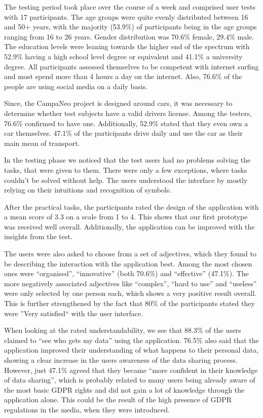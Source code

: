 \documentclass[../paper.tex]{subfiles}
\begin{document}
  The testing period took place over the course of a week and comprised
  user tests with 17 participants. The age groups were quite evenly
  distributed between 16 and 50+ years, with the majority (53.9\%) of
  participants being in the age groups ranging from 16 to 26 years.
  Gender distribution was 70.6\% female, 29.4\% male. The education levels
  were leaning towards the higher end of the spectrum with 52.9\% having a
  high school level degree or equivalent and 41.1\% a university degree.
  All participants assessed themselves to be competent with internet
  surfing and most spend more than 4 hours a day on the internet. Also,
  76.6\% of the people are using social media on a daily basis.

  Since, the CampaNeo project is designed around cars, it was necessary to
  determine whether test subjects have a valid drivers license. Among
  the testers, 76.6\% confirmed to have one. Additionally, 52.9\% stated
  that they even own a car themselves. 47.1\% of the participants drive daily
  and use the car as their main mean of transport.

  In the testing phase we noticed that the test users had no problems solving
  the tasks, that were given to them. There were only a few exceptions, where
  tasks couldn't be solved without help. The users understood the interface by
  mostly relying on their intuitions and recognition of symbols.

  After the practical tasks, the participants rated the design of the
  application with a mean score of 3.3 on a scale from 1 to 4. This shows
  that our first prototype was received well overall. Additionally, the
  application can be improved with the insights from the test.

  The users were also asked to choose from a set of adjectives, which they
  found to be describing the interaction with the application best. Among the
  most chosen ones were ``organised'', ``innovative'' (both 70.6\%) and
  ``effective'' (47.1\%). The more negatively associated adjectives like
  ``complex'', ``hard to use'' and ``useless'' were only selected by one person
  each, which shows a very positive result overall. This is further strengthened
  by the fact that 80\% of the participants stated they were ''Very satisfied``
  with the user interface.

  When looking at the rated understandability, we see that 88.3\% of the users
  claimed to ``see who gets my data'' using the application. 76.5\% also said
  that the application improved their understanding of what happens to their
  personal data, showing a clear increase in the users awareness of the data
  sharing process. However, just 47.1\% agreed that they became ``more confident
  in their knowledge of data sharing'', which is probably related to many users
  being already aware of the most basic GDPR rights and did not gain a lot of
  knowledge through the application alone. This could be the result of the high
  presence of GDPR regulations in the media, when they were introduced.
\end{document}
